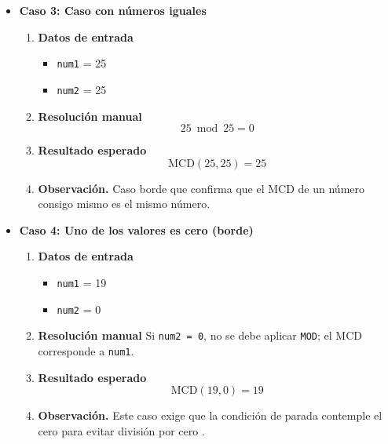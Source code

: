 \documentclass[12pt,twoside]{book}
\begin{document}
\begin{itemize}
							
							\item \textbf{Caso 3: Caso con números iguales}
							\begin{enumerate}
								\item \textbf{Datos de entrada}
								\begin{itemize}
									\item \texttt{num1} = 25
									\item \texttt{num2} = 25
								\end{itemize}
								\item \textbf{Resolución manual}
								\[
								25 \bmod 25 = 0
								\]
								\item \textbf{Resultado esperado}
								\[
								\text{MCD}(25,25) = 25
								\]
								\item \textbf{Observación.} Caso borde que confirma que el MCD de un número consigo mismo es el mismo número.
							\end{enumerate}
							
							
							\item \textbf{Caso 4: Uno de los valores es cero (borde)}
							\begin{enumerate}
								\item \textbf{Datos de entrada}
								\begin{itemize}
									\item \texttt{num1} = 19
									\item \texttt{num2} = 0
								\end{itemize}
								\item \textbf{Resolución manual}
								Si \texttt{num2 = 0}, no se debe aplicar \texttt{MOD}; el MCD corresponde a \texttt{num1}.
								\item \textbf{Resultado esperado}
								\[
								\text{MCD}(19,0) = 19
								\]
								\item \textbf{Observación.} Este caso exige que la condición de parada contemple el cero para evitar división por cero \cite{Pressman2019Software,Sommerville2015Software}.
							\end{enumerate}
							
							

\end{itemize}
\end{document}
